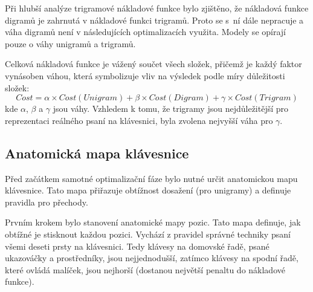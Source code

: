 \documentclass[a4paper, twoside, 12pt, czech]{article}
\begin{document}
Při hlubší analýze trigramové nákladové funkce bylo zjištěno, že 
nákladová funkce digramů je zahrnutá v nákladové funkci trigramů. Proto se s~ní 
dále nepracuje a váha digramů není v následujících optimalizacích využita. Modely 
se opírají pouze o váhy unigramů a trigramů.

%

Celková nákladová funkce je vážený součet všech složek, přičemž je každý faktor
vynásoben váhou, která symbolizuje vliv na výsledek podle míry důležitosti složek:
\begin{equation*}
    Cost = \alpha \times Cost(Unigram) + \beta \times Cost(Digram) + \gamma \times Cost(Trigram)
\end{equation*}
kde $\alpha$, $\beta$ a $\gamma$ jsou váhy. Vzhledem k tomu, že trigramy jsou nejdůležitější
pro reprezentaci reálného psaní na klávesnici, byla zvolena nejvyšší váha pro $\gamma$.

\subsection{Anatomická mapa klávesnice}

Před začátkem samotné optimalizační fáze bylo nutné určit anatomickou mapu klávesnice.
Tato mapa přiřazuje obtížnost dosažení (pro unigramy) a definuje pravidla pro přechody. 

Prvním krokem bylo stanovení anatomické mapy pozic. Tato mapa definuje, jak obtížné 
je stisknout každou pozici. Vychází z pravidel správné techniky psaní 
všemi deseti prsty na klávesnici. Tedy klávesy na domovské řadě, psané ukazováčky a
 prostředníky, jsou nejjednodušší, zatímco klávesy na spodní řadě, které ovládá 
 malíček, jsou nejhorší (dostanou největší penaltu do nákladové funkce).

\end{document}
